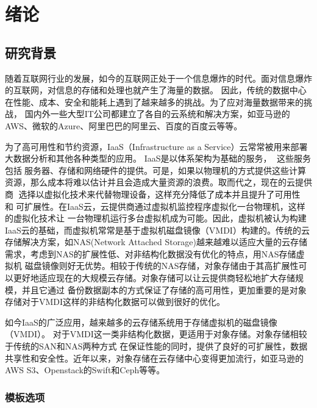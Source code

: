 
\chapter{绪论}
\label{chap:xulun}
\section{研究背景}
随着互联网行业的发展，如今的互联网正处于一个信息爆炸的时代。面对信息爆炸的互联网，对信息的存储和处理也就产生了海量的数据。
因此，传统的数据中心在性能、成本、安全和能耗上遇到了越来越多的挑战。为了应对海量数据带来的挑战，
国内外一些大型IT公司都建立了各自的云系统和解决方案，如亚马逊的AWS、微软的Azure、阿里巴巴的阿里云、百度的百度云等等。


为了高可用性和节约资源，IaaS（Infrastructure as a Service）云常常被用来部署大数据分析和其他各种类型的应用。 IaaS是以体系架构为基础的服务，
这些服务包括服务器、存储和网络硬件的提供。可是，如果以物理机的方式提供这些计算资源，那么成本将难以估计并且会造成大量资源的浪费。取而代之，现在的云提供商
选择以虚拟化技术来代替物理设备，这样充分降低了成本并且提升了可用性和可扩展性。在IaaS云，云提供商通过虚拟机监控程序虚拟化一台物理机，这样的虚拟化技术让
一台物理机运行多台虚拟机成为可能\cite{feng2014price}。因此，虚拟机被认为构建IaaS云的基础，而虚拟机常常是基于虚拟机磁盘镜像（VMDI）构建的。传统的云
存储解决方案，如NAS(Network Attached Storage)越来越难以适应大量的云存储需求，考虑到NAS的扩展性低、对非结构化数据没有优化的特点，用NAS存储虚拟机
磁盘镜像则好无优势。相较于传统的NAS存储，对象存储由于其高扩展性可以更好地适应现在的大规模云存储。对象存储可以让云提供商轻松地扩大存储规模，并且它通过
备份数据副本的方式保证了存储的高可用性，更加重要的是对象存储对于VMDI这样的非结构化数据可以做到很好的优化。


如今IaaS的广泛应用，越来越多的云存储系统用于存储虚拟机的磁盘镜像（VMDI）。
对于VMDI这一类非结构化数据，更适用于对象存储。对象存储相较于传统的SAN和NAS两种方式
在保证性能的同时，提供了良好的可扩展性，数据共享性和安全性。近年以来，对象存储在云存储中心变得更加流行，如亚马逊的AWS S3、Openstack的Swift和Ceph等等。


\subsection{模板选项}
\label{sec:thesisoption}

